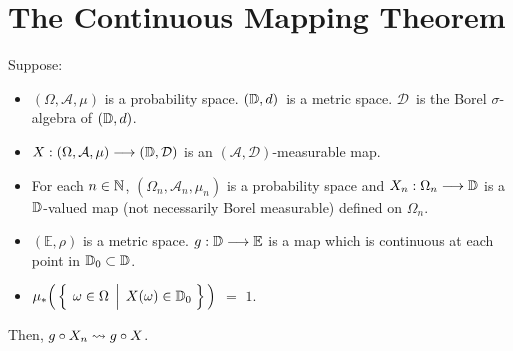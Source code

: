 

\section{The Continuous Mapping Theorem}
\setcounter{theorem}{0}
\setcounter{equation}{0}


\renewcommand{\theenumi}{\roman{enumi}}
\renewcommand{\labelenumi}{\textnormal{(\theenumi)}$\;\;$}


\begin{theorem}
\mbox{}\vskip 0.1cm
\noindent
Suppose:
\begin{itemize}
\item
	$(\Omega,\mathcal{A},\mu)$ is a probability space.
	$(\mathbb{D},d)$\, is a metric space.
	$\mathcal{D}$\, is the Borel $\sigma$-algebra of $(\mathbb{D},d)$.
\item
	$X : (\Omega,\mathcal{A},\mu) \longrightarrow (\mathbb{D},\mathcal{D})$
	is an $(\mathcal{A},\mathcal{D})$-measurable map.
\item
	For each $n \in \mathbb{N}$,
	$(\Omega_{n},\mathcal{A}_{n},\mu_{n})$ is a probability space and
	$X_{n} : \Omega_{n} \longrightarrow \mathbb{D}$
	is a $\mathbb{D}$-valued map (not necessarily Borel measurable) defined on $\Omega_{n}$.
\item
	$(\mathbb{E},\rho)$ is a metric space.
	$g : \mathbb{D} \longrightarrow \mathbb{E}$ is a map which is continuous at each point in $\mathbb{D}_{0} \subset \mathbb{D}$.
\item
	$\mu_{*}\!\left(\,\left\{\;\left.\omega\overset{{\color{white}.}}{\in}\Omega\;\,\right\vert\;X(\omega)\in\D_{0}\;\right\}\,\right)$
	\;$=$\; $1$.
\end{itemize}
Then, \;$g \circ X_{n} \rightsquigarrow g \circ X$.
\end{theorem}
\proof

